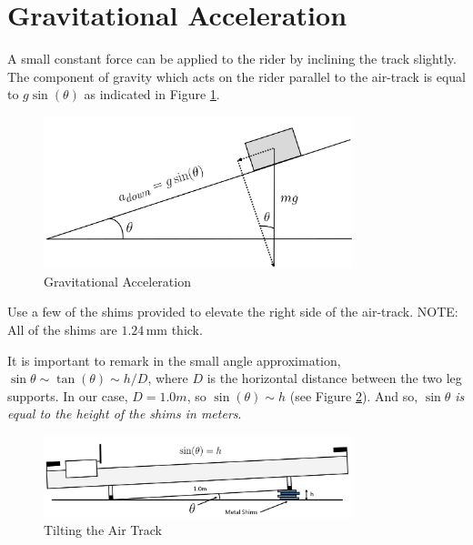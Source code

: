 \section{Gravitational Acceleration}

A small constant force can be applied to the rider by inclining the track slightly.  The component of gravity which acts on the rider parallel to the air-track is equal to $g\sin(\theta)$ as indicated in Figure \ref{fig:slope}.

\begin{figure}[h]
    \begin{center}
        \includegraphics[width=0.8\textwidth]{./Exp2/pic/image14.jpg}
    \end{center}
    \caption{Gravitational Acceleration}
    \label{fig:slope}
\end{figure}

Use a few of the shims provided to elevate the right side of the air-track. NOTE: All of the shims are $1.24\,\mathrm{mm}$ thick. \myskip

It is important to remark in the small angle approximation, $\sin\theta \sim \tan(\theta) \sim h/D$, where $D$ is the horizontal distance between the two leg supports. In our case, $D=1.0m$, so $\sin(\theta) \sim h$ (see Figure \ref{fig:shims}). And so, {\it{ $\sin\theta$ is equal to the height of the shims in meters}}.
\begin{figure}[h]
    \begin{center}
        \includegraphics[width=0.8\textwidth]{./Exp2/pic/image15.jpg}
    \end{center}
    \caption{Tilting the Air Track}
    \label{fig:shims}
\end{figure}

